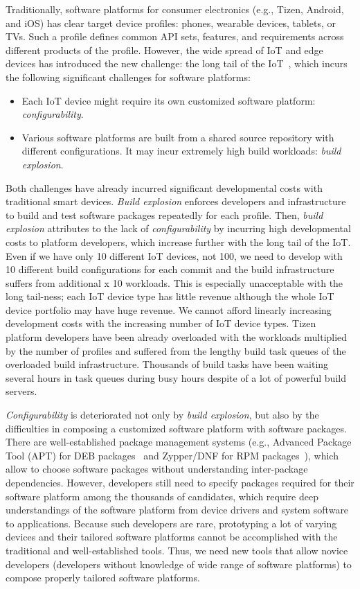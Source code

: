 Traditionally, software platforms for consumer electronics (e.g., Tizen, Android, and iOS) has clear target device profiles: phones, wearable devices, tablets, or TVs.
Such a profile defines common API sets, features, and requirements across different products of the profile.
However, the wide spread of IoT and edge devices has introduced the new challenge: the long tail of the IoT~\cite{1Want2015EnablingTI}, which incurs the following significant challenges for software platforms:
\begin{itemize}
\item Each IoT device might require its own customized software platform: \textit{configurability}.
\item Various software platforms are built from a shared source repository with different configurations. It may incur extremely high build workloads: \textit{build explosion}.
\end{itemize}

Both challenges have already incurred significant developmental costs with traditional smart devices.
\textit{Build explosion} enforces developers and infrastructure to build and test software packages repeatedly for each profile.
Then, \textit{build explosion} attributes to the lack of \textit{configurability} by incurring high developmental costs to platform developers, which increase further with the long tail of the IoT.
Even if we have only 10 different IoT devices, not 100, we need to develop with 10 different build configurations for each commit and the build infrastructure suffers from additional x 10 workloads.
This is especially unacceptable with the long tail-ness; each IoT device type has little revenue although the whole IoT device portfolio may have huge revenue.
We cannot afford linearly increasing development costs with the increasing number of IoT device types.
Tizen platform developers have been already overloaded with the workloads multiplied by the number of profiles and suffered from the lengthy build task queues of the overloaded build infrastructure.
Thousands of build tasks have been waiting several hours in task queues during busy hours despite of a lot of powerful build servers.

\textit{Configurability} is deteriorated not only by \textit{build explosion}, but also by the difficulties in composing a customized software platform with software packages.
There are well-established package management systems (e.g., Advanced Package Tool (APT) for DEB packages~\cite{blackman2000debian} and Zypper/DNF for RPM packages~\cite{foster2003red}), which allow to choose software packages without understanding inter-package dependencies.
However, developers still need to specify packages required for their software platform among the thousands of candidates, which require deep understandings of the software platform from device drivers and system software to applications.
Because such developers are rare, prototyping a lot of varying devices and their tailored software platforms cannot be accomplished with the traditional and well-established tools.
Thus, we need new tools that allow novice developers (developers without knowledge of wide range of software platforms) to compose properly tailored software platforms.


